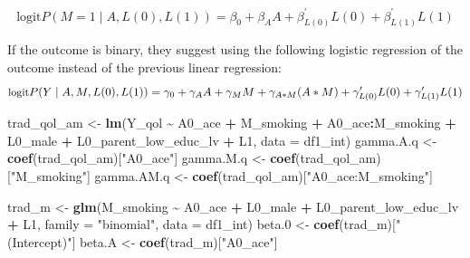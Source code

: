 \documentclass[
]{book}
\newenvironment{Shaded}{\begin{snugshade}}{\end{snugshade}}
\newcommand{\AttributeTok}[1]{\textcolor[rgb]{0.13,0.29,0.53}{#1}}
\newcommand{\FloatTok}[1]{\textcolor[rgb]{0.00,0.00,0.81}{#1}}
\newcommand{\FunctionTok}[1]{\textcolor[rgb]{0.13,0.29,0.53}{\textbf{#1}}}
\newcommand{\NormalTok}[1]{#1}
\newcommand{\OtherTok}[1]{\textcolor[rgb]{0.56,0.35,0.01}{#1}}
\newcommand{\SpecialCharTok}[1]{\textcolor[rgb]{0.81,0.36,0.00}{\textbf{#1}}}
\newcommand{\StringTok}[1]{\textcolor[rgb]{0.31,0.60,0.02}{#1}}
\begin{document}
\begin{equation} 
\text{logit}P(M=1 \mid A,L(0),L(1)) = \beta_0 + \beta_A A + \beta_{L(0)}^\prime L(0) + \beta_{L(1)}^\prime L(1)
\label{eq:medreg}
\end{equation}

If the outcome is binary, they suggest using the following logistic regression of the outcome instead of the previous linear regression:
\begin{equation}
\small
\text{logit}P(Y \mid A, M,L(0),L(1)) = \gamma_0 + \gamma_A A + \gamma_M M + \gamma_{A \ast M} (A \ast M) + \gamma_{L(0)}^\prime L(0) + \gamma_{L(1)}^\prime L(1) 
\label{eq:binoutcomereg}
\end{equation}

\begin{Shaded}
\begin{Highlighting}[]
\NormalTok{trad\_qol\_am }\OtherTok{\textless{}{-}} \FunctionTok{lm}\NormalTok{(Y\_qol }\SpecialCharTok{\textasciitilde{}}\NormalTok{ A0\_ace }\SpecialCharTok{+}\NormalTok{ M\_smoking }\SpecialCharTok{+}\NormalTok{ A0\_ace}\SpecialCharTok{:}\NormalTok{M\_smoking }\SpecialCharTok{+}
\NormalTok{                    L0\_male }\SpecialCharTok{+}\NormalTok{ L0\_parent\_low\_educ\_lv }\SpecialCharTok{+}\NormalTok{ L1,}
                  \AttributeTok{data =}\NormalTok{ df1\_int)}
\NormalTok{gamma.A.q }\OtherTok{\textless{}{-}} \FunctionTok{coef}\NormalTok{(trad\_qol\_am)[}\StringTok{"A0\_ace"}\NormalTok{]}
\NormalTok{gamma.M.q }\OtherTok{\textless{}{-}} \FunctionTok{coef}\NormalTok{(trad\_qol\_am)[}\StringTok{"M\_smoking"}\NormalTok{]}
\NormalTok{gamma.AM.q }\OtherTok{\textless{}{-}} \FunctionTok{coef}\NormalTok{(trad\_qol\_am)[}\StringTok{"A0\_ace:M\_smoking"}\NormalTok{]}

\NormalTok{trad\_m }\OtherTok{\textless{}{-}} \FunctionTok{glm}\NormalTok{(M\_smoking }\SpecialCharTok{\textasciitilde{}}\NormalTok{ A0\_ace }\SpecialCharTok{+}\NormalTok{ L0\_male }\SpecialCharTok{+}\NormalTok{ L0\_parent\_low\_educ\_lv }\SpecialCharTok{+}\NormalTok{ L1, }
              \AttributeTok{family =} \StringTok{"binomial"}\NormalTok{,}
              \AttributeTok{data =}\NormalTok{ df1\_int)}
\NormalTok{beta}\FloatTok{.0} \OtherTok{\textless{}{-}} \FunctionTok{coef}\NormalTok{(trad\_m)[}\StringTok{"(Intercept)"}\NormalTok{]}
\NormalTok{beta.A }\OtherTok{\textless{}{-}} \FunctionTok{coef}\NormalTok{(trad\_m)[}\StringTok{"A0\_ace"}\NormalTok{]}


\end{Highlighting}
\end{Shaded}
\end{document}
